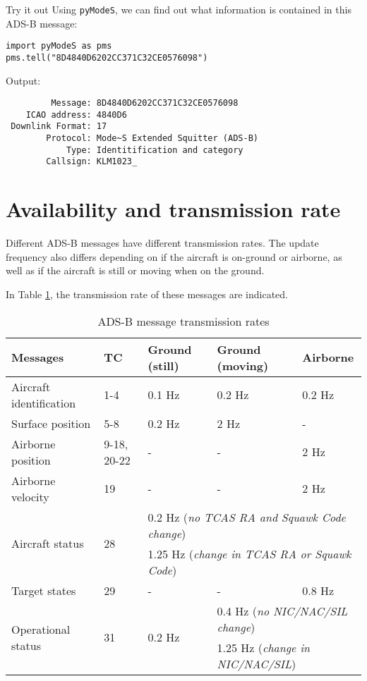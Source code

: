 \begin{notebox}{Try it out}
  Using \texttt{pyModeS}, we can find out what information is contained in this ADS-B message:

\begin{verbatim}
import pyModeS as pms
pms.tell("8D4840D6202CC371C32CE0576098")
\end{verbatim}

Output:

\begin{verbatim}
         Message: 8D4840D6202CC371C32CE0576098 
    ICAO address: 4840D6 
 Downlink Format: 17 
        Protocol: Mode~S Extended Squitter (ADS-B) 
            Type: Identitification and category 
        Callsign: KLM1023_ 
\end{verbatim}
  

\end{notebox}



\section{Availability and transmission rate}

Different ADS-B messages have different transmission rates. The update frequency also differs depending on if the aircraft is on-ground or airborne, as well as if the aircraft is still or moving when on the ground.

In Table \ref{tb:adsb-transmission-rate}, the transmission rate of these messages are indicated.

\begin{table}[ht]
  \footnotesize
  \centering
  \caption{ADS-B message transmission rates}
  \label{tb:adsb-transmission-rate}
  \begin{tabular}{|l|l|l|l|l|}
  \hline
  \textbf{Messages} & \textbf{TC} & \textbf{Ground (still)} & \textbf{Ground (moving)} & \textbf{Airborne} \\ \hline
  Aircraft identification & 1-4 & 0.1 Hz & 0.2 Hz & 0.2 Hz \\ \hline
  Surface position & 5-8 & 0.2 Hz & 2 Hz & - \\ \hline
  Airborne position & 9-18, 20-22 & - & - & 2 Hz \\ \hline
  Airborne velocity & 19 & - & - & 2 Hz \\ \hline
  \multirow{2}{*}{Aircraft status} & \multirow{2}{*}{28} & \multicolumn{3}{l|}{0.2 Hz (\textit{no TCAS RA and Squawk Code change})} \\ \cline{3-5} 
   &  & \multicolumn{3}{l|}{1.25 Hz (\textit{change in TCAS RA or Squawk Code})} \\ \hline
  Target states & 29 & - & - & 0.8 Hz \\ \hline
  \multirow{2}{*}{Operational status} & \multirow{2}{*}{31} & \multirow{2}{*}{0.2 Hz} & \multicolumn{2}{l|}{0.4 Hz (\textit{no NIC/NAC/SIL change})} \\ \cline{4-5} 
   &  &  & \multicolumn{2}{l|}{1.25 Hz (\textit{change in NIC/NAC/SIL})} \\ \hline
  \end{tabular}
\end{table}

